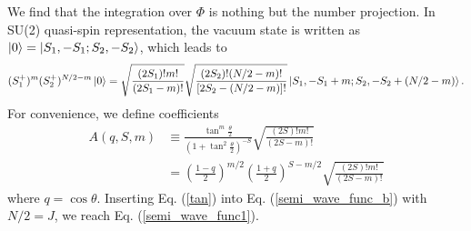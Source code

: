 \documentclass[11pt]{book} %
\begin{document}
We find that the integration over $\Phi$ is nothing but the number projection.
In SU(2) quasi-spin representation, the vacuum state is written as
$\ket{0}=\ket{S_1,-S_1;S_2,-S_2}$, which leads to
\begin{align}
  (S_1^{+})^m(S_2^{+})^{N/2-m} \ket{0} 
  = \sqrt{\frac{(2S_1)!m!}{(2S_1-m)!}} \sqrt{\frac{(2S_2)!(N/2-m)!}{[2S_2-(N/2-m)]!}}
  \ket{S_1,-S_1+m;S_2,-S_2+(N/2-m)}.
\end{align}
For convenience, we define coefficients
\begin{align}
  A(q,S,m) &\equiv 
  \frac{\tan^m{\frac{\theta}{2}}}{\left(1+\tan^2{\frac{\theta}{2}}\right)^{-S}}
  \sqrt{\frac{(2S)!m!}{(2S-m)!}}  \nonumber \\
  &= \left(\frac{1-q}{2}\right)^{m/2}\left(\frac{1+q}{2}\right)^{S-m/2} \sqrt{\frac{(2S)!m!}{(2S-m)!}}
\label{tan}
\end{align}
where $q=\cos{\theta}$.
Inserting Eq. (\ref{tan}) into Eq. (\ref{semi_wave_func_b}) with $N/2=J$,
we reach Eq. (\ref{semi_wave_func1}).




\end{document}
